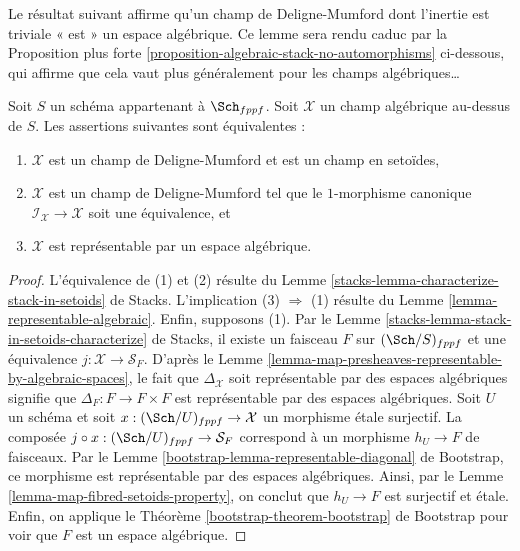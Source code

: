 \noindent
Le résultat suivant affirme qu'un champ de Deligne-Mumford dont l'inertie
est triviale « est » un espace algébrique. Ce lemme sera rendu caduc par la
Proposition plus forte \ref{proposition-algebraic-stack-no-automorphisms}
ci-dessous, qui affirme que cela vaut plus généralement pour les champs algébriques…

\begin{lemma}
\label{lemma-algebraic-stack-no-automorphisms}
Soit $S$ un schéma appartenant à $\Sch_{fppf}$.
Soit $\mathcal{X}$ un champ algébrique au-dessus de $S$.
Les assertions suivantes sont équivalentes :
\begin{enumerate}
\item $\mathcal{X}$ est un champ de Deligne-Mumford et est un champ en setoïdes,
\item $\mathcal{X}$ est un champ de Deligne-Mumford tel que le
$1$-morphisme canonique $\mathcal{I}_\mathcal{X} \to \mathcal{X}$
soit une équivalence, et
\item $\mathcal{X}$ est représentable par un espace algébrique.
\end{enumerate}
\end{lemma}

\begin{proof}
L'équivalence de (1) et (2) résulte du
Lemme \ref{stacks-lemma-characterize-stack-in-setoids} de Stacks.
L'implication (3) $\Rightarrow$ (1) résulte du
Lemme \ref{lemma-representable-algebraic}.
Enfin, supposons (1). Par le
Lemme \ref{stacks-lemma-stack-in-setoids-characterize} de Stacks,
il existe un faisceau $F$ sur $(\Sch/S)_{fppf}$
et une équivalence $j : \mathcal{X} \to \mathcal{S}_F$. D'après le
Lemme \ref{lemma-map-presheaves-representable-by-algebraic-spaces},
le fait que $\Delta_\mathcal{X}$ soit représentable par des espaces
algébriques signifie que $\Delta_F : F \to F \times F$
est représentable par des espaces algébriques.
Soit $U$ un schéma et soit $x : (\Sch/U)_{fppf} \to \mathcal{X}$
un morphisme \'etale surjectif. La composée
$j \circ x : (\Sch/U)_{fppf} \to \mathcal{S}_F$
correspond à un morphisme $h_U \to F$ de faisceaux. Par le
Lemme \ref{bootstrap-lemma-representable-diagonal} de Bootstrap,
ce morphisme est représentable par des espaces algébriques.
Ainsi, par le
Lemme \ref{lemma-map-fibred-setoids-property},
on conclut que $h_U \to F$ est surjectif et \'etale.
Enfin, on applique le
Théorème \ref{bootstrap-theorem-bootstrap} de Bootstrap
pour voir que $F$ est un espace algébrique.
\end{proof}

